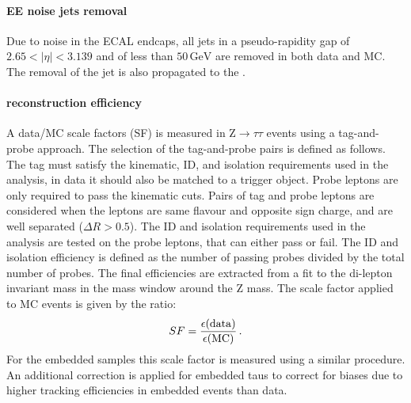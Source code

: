 \paragraph{EE noise jets removal} Due to noise in the ECAL endcaps, all jets in a pseudo-rapidity gap of $2.65 < |\eta| < 3.139$ and of less than $50 \,\mathrm{GeV}$ are removed in both data and MC. The removal of the jet is also propagated to the \MET.

\paragraph{\tauh reconstruction efficiency} A data/MC scale factors (SF) is measured in $\mathrm{Z}\rightarrow\tau\tau$ events using a tag-and-probe approach. The selection of the tag-and-probe pairs is defined as follows. The tag \tauh must satisfy the kinematic, ID, and isolation requirements used in the analysis, in data it should also be matched to a trigger object. Probe leptons are only required to pass the kinematic cuts. Pairs of tag and probe leptons are considered when the leptons are same flavour and opposite sign charge, and are well separated ($\Delta R > 0.5$). The ID and isolation requirements used in the analysis are tested on the probe leptons, that can either pass or fail. The ID and isolation efficiency is defined as the number of passing probes divided by the total number of probes. The final efficiencies are extracted from a fit to the di-lepton invariant mass in the mass window around the $\mathrm{Z}$ mass. The scale factor applied to MC events is given by the ratio:
\begin{equation}
    SF = \frac{\epsilon(\mathrm{data})}{\epsilon(\mathrm{MC})} \mend
\end{equation}
For the embedded samples this scale factor is measured using a similar procedure. An additional correction is applied for embedded taus to correct for biases due to higher tracking efficiencies in embedded events than data. 

